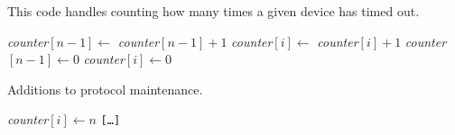 \begin{algorithm}[H]
\caption{This code handles counting how many times a given device has timed out.}
\label{lst:general_case3}
\begin{algorithmic}[1]
            \State \textit{counter}$[n - 1] \gets$ \textit{counter}$[n - 1] + 1$
            \State \textit{counter}$[i] \gets$ \textit{counter}$[i] + 1$
        \EndIf
    \Else
            \State \textit{counter}$[n - 1] \gets 0$
            \State \textit{counter}$[i] \gets 0$
        \EndIf
    \EndIf
\EndProcedure
\end{algorithmic}    
\end{algorithm}

\begin{algorithm}[H]
\caption{Additions to protocol maintenance.}
\label{lst:maintaniance1}
\begin{algorithmic}[1]
                \State \textit{counter}$[i] \gets n$
            \EndFor
        \EndIf
    \EndIf
\Statex \texttt{[\ldots]}
\EndProcedure
\end{algorithmic}    
\end{algorithm}
 